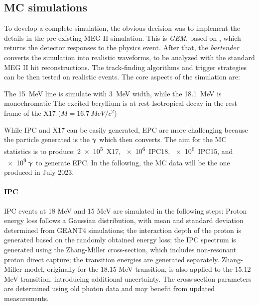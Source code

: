\begin{refsection}
    \subsection{MC simulations}
        To develop a complete simulation, the obvious decision was to implement the details in the pre-existing MEG II simulation.
        This is \textit{GEM}, based on \gf, which returns the detector responses to the physics event. 
        After that, the \textit{bartender} converts the simulation into realistic waveforms, to be analyzed with the standard MEG II hit reconstructions.
        The track-finding algorithms and trigger strategies can be then tested on realistic events.
        The core aspects of the simulation are:
        \begin{outline}
            \1 The \SI{15}{MeV} line is simulate with \SI{3}{MeV} width, while the \SI{18.1}{MeV} is monochromatic
            \1 The excited beryllium is at rest
            \1 Isotropical decay in the rest frame of the X17 ($M=\SI{16.7}{MeV/c^2}$)
        \end{outline}     
        While IPC and X17 can be easily generated, EPC are more challenging because the particle generated is the $\upgamma$ which then converts.
        The aim for the MC statistics is to produce: \SI{2e5}{X17}, \SI{e6}{IPC18}, \SI{e6}{IPC15}, and \num{e9} $\upgamma$ to generate EPC.
        In the following, the MC data will be the one produced in July 2023.

        \paragraph{IPC}
        IPC events at 18 MeV and 15 MeV are simulated in the following steps: Proton energy loss follows a Gaussian distribution, with mean and standard deviation determined from GEANT4 simulations; 
        the interaction depth of the proton is generated based on the randomly obtained energy loss;
        the IPC spectrum is generated using the Zhang-Miller cross-section, which includes non-resonant proton direct capture;
        the transition energies are generated separately. Zhang-Miller model, originally for the 18.15 MeV transition, is also applied to the 15.12 MeV transition, introducing additional uncertainty. The cross-section parameters are determined using old photon data and may benefit from updated measurements.
    

\end{refsection}
